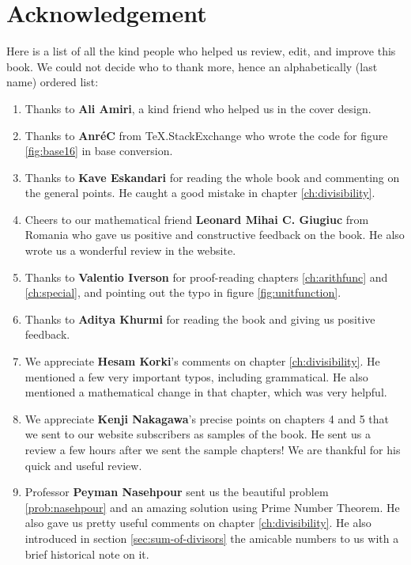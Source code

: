 \documentclass[leqno, 12pt]{book}
\begin{document}
	
	\newpage
\section*{Acknowledgement}

Here is a list of all the kind people who helped us review, edit, and improve this book. We could not decide who to thank more, hence an alphabetically (last name) ordered list:
	\begin{enumerate}
		\item Thanks to \textbf{Ali Amiri}, a kind friend who helped us in the cover design. 
		\item Thanks to \textbf{Anr\' eC} from TeX.StackExchange who wrote the code for figure \eqref{fig:base16} in base conversion.
		\item Thanks to \textbf{Kave Eskandari} for reading the whole book and commenting on the general points. He caught a good mistake in chapter \ref{ch:divisibility}.
		\item Cheers to our mathematical friend \textbf{Leonard Mihai C. Giugiuc} from Romania who gave us positive and constructive feedback on the book. He also wrote us a wonderful review in the website. 

		\item Thanks to \textbf{Valentio Iverson} for proof-reading chapters \ref{ch:arithfunc} and \ref{ch:special}, and pointing out the typo in figure \eqref{fig:unitfunction}.

		\item Thanks to \textbf{Aditya Khurmi} for reading the book and giving us positive feedback.
				
				
		\item We appreciate \textbf{Hesam Korki}'s comments on chapter \ref{ch:divisibility}. He mentioned a few very important typos, including grammatical. He also mentioned a mathematical change in that chapter, which was very helpful.
		
		\item We appreciate \textbf{Kenji Nakagawa}'s precise points on chapters 4 and 5 that we sent to our website subscribers as samples of the book. He sent us a review a few hours after we sent the sample chapters! We are thankful for his quick and useful review.
		
		\item Professor \textbf{Peyman Nasehpour} sent us the beautiful problem \eqref{prob:nasehpour} and an amazing solution using Prime Number Theorem. He also gave us pretty useful comments on chapter \ref{ch:divisibility}. He also introduced in section \eqref{sec:sum-of-divisors} the amicable numbers to us with a brief historical note on it.
				

\end{enumerate}
\end{document}
